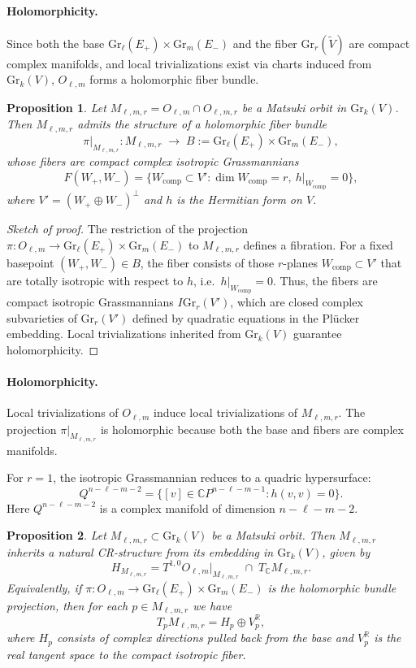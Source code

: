 \documentclass[12pt,a4paper]{article}
\theoremstyle{plain}
\newtheorem{proposition}{Proposition}
\theoremstyle{definition}
\theoremstyle{remark}
\begin{document}
\paragraph{Holomorphicity.}
Since both the base \(\mathrm{Gr}_\ell(E_+) \times \mathrm{Gr}_m(E_-)\) and the fiber \(\mathrm{Gr}_r(\tilde{V})\) are compact complex manifolds, and local trivializations exist via charts induced from \(\mathrm{Gr}_k(V)\), \(O_{\ell,m}\) forms a holomorphic fiber bundle.
\begin{proposition}
Let $M_{\ell,m,r} = O_{\ell,m} \cap O_{\ell,m,r}$ be a Matsuki orbit in 
$\mathrm{Gr}_k(V)$. 
Then $M_{\ell,m,r}$ admits the structure of a holomorphic fiber bundle
\[
\pi|_{M_{\ell,m,r}} : M_{\ell,m,r} \;\longrightarrow\; 
B := \mathrm{Gr}_\ell(E_+) \times \mathrm{Gr}_m(E_-),
\]
whose fibers are compact complex isotropic Grassmannians
\[
F(W_+,W_-) = \{ W_{\mathrm{comp}} \subset V' : 
\dim W_{\mathrm{comp}} = r, \ h|_{W_{\mathrm{comp}}} = 0 \},
\]
where $V' = (W_+ \oplus W_-)^\perp$ and $h$ is the Hermitian form on $V$. 
\end{proposition}

\begin{proof}[Sketch of proof]
The restriction of the projection 
$\pi: O_{\ell,m} \to \mathrm{Gr}_\ell(E_+) \times \mathrm{Gr}_m(E_-)$ 
to $M_{\ell,m,r}$ defines a fibration. 
For a fixed basepoint $(W_+,W_-) \in B$, the fiber consists of those 
$r$-planes $W_{\mathrm{comp}} \subset V'$ that are totally isotropic with 
respect to $h$, i.e.\ $h|_{W_{\mathrm{comp}}}=0$. 
Thus, the fibers are compact isotropic Grassmannians 
$I\mathrm{Gr}_r(V')$, which are closed complex subvarieties of 
$\mathrm{Gr}_r(V')$ defined by quadratic equations in the Plücker embedding. 
Local trivializations inherited from $\mathrm{Gr}_k(V)$ guarantee 
holomorphicity. 
\end{proof}


\paragraph{Holomorphicity.}
Local trivializations of \(O_{\ell,m}\) induce local trivializations of \(M_{\ell,m,r}\). The projection \(\pi|_{M_{\ell,m,r}}\) is holomorphic because both the base and fibers are complex manifolds.

For \(r=1\), the isotropic Grassmannian reduces to a quadric hypersurface:
\[
Q^{n-\ell-m-2} = \{[v] \in \mathbb{C}P^{n-\ell-m-1} : h(v,v)=0\}.
\]
Here \(Q^{n-\ell-m-2}\) is a complex manifold of dimension \(n-\ell-m-2\).
\begin{proposition}
Let $M_{\ell,m,r} \subset \mathrm{Gr}_k(V)$ be a Matsuki orbit. 
Then $M_{\ell,m,r}$ inherits a natural CR-structure from its embedding 
in $\mathrm{Gr}_k(V)$, given by
\[
H_{M_{\ell,m,r}} 
= T^{1,0} O_{\ell,m}\big|_{M_{\ell,m,r}} \;\cap\; T_{\mathbb{C}} M_{\ell,m,r}.
\]
Equivalently, if $\pi: O_{\ell,m} \to \mathrm{Gr}_\ell(E_+) \times \mathrm{Gr}_m(E_-)$ 
is the holomorphic bundle projection, then for each $p \in M_{\ell,m,r}$ we have
\[
T_p M_{\ell,m,r} = H_p \oplus V^{\mathbb{R}}_p,
\]
where $H_p$ consists of complex directions pulled back from the base and 
$V^{\mathbb{R}}_p$ is the real tangent space to the compact isotropic fiber. 
\end{proposition}
\end{document}
